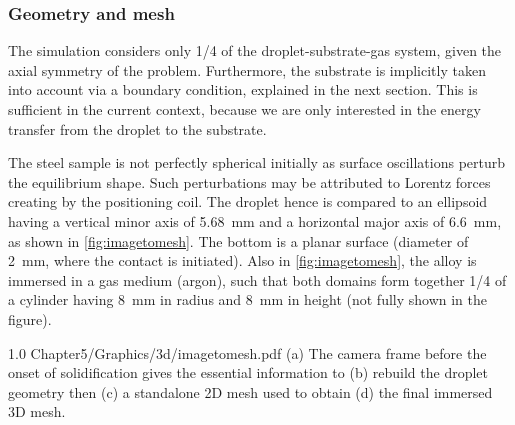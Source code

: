 \subsubsection{Geometry and mesh}

The simulation considers only 1/4 of the droplet-substrate-gas system, given the axial symmetry of the problem.
Furthermore, the substrate is implicitly taken into account via a boundary condition, explained in the next section. 
This is sufficient in the current context, because we are only interested in the energy transfer from the droplet to the substrate. 

The steel sample is not perfectly spherical initially as surface oscillations perturb the equilibrium shape. 
Such perturbations may be attributed to Lorentz forces creating by the positioning coil. 
The droplet hence is compared to an ellipsoid having
a vertical minor axis of \SI{5.68}{\milli \metre} and a horizontal major axis of \SI{6.6}{\milli \metre}, as shown in \cref{fig:imagetomesh}.
The bottom is a planar surface (diameter of \SI{2}{\milli \metre}, where the contact is initiated). 
Also in \cref{fig:imagetomesh}, the alloy is immersed in a gas medium (argon), such that both domains form together 1/4 of a 
cylinder having \SI{8}{\milli \metre} in radius and  \SI{8}{\milli \metre} in height (not fully shown in the figure).

\begin{figureth}
{1.0}
{Chapter5/Graphics/3d/imagetomesh.pdf}
{(a) The camera frame before the onset of solidification gives the essential information to (b) 
rebuild the droplet geometry then (c) a standalone 2D mesh used to obtain (d) the final immersed 3D mesh.}
\label{fig:imagetomesh}
\end{figureth}

